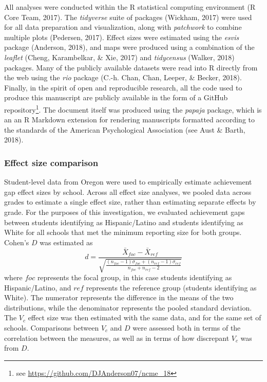 \documentclass[man, fleqn, noextraspace]{apa6}
\theoremstyle{definition}
\theoremstyle{definition}
\theoremstyle{definition}
\theoremstyle{remark}
\begin{document}
All analyses were conducted within the R statistical computing
environment (R Core Team, 2017). The \emph{tidyverse} suite of packages
(Wickham, 2017) were used for all data preparation and visualization,
along with \emph{patchwork} to combine multiple plots (Pedersen, 2017).
Effect sizes were estimated using the \emph{esvis} package (Anderson,
2018), and maps were produced using a combination of the \emph{leaflet}
(Cheng, Karambelkar, \& Xie, 2017) and \emph{tidycensus} (Walker, 2018)
packages. Many of the publicly available datasets were read into R
directly from the web using the \emph{rio} package (C.-h. Chan, Chan,
Leeper, \& Becker, 2018). Finally, in the spirit of open and
reproducible research, all the code used to produce this manuscript are
publicly available in the form of a GitHub repository\footnote{see
  \url{https://github.com/DJAnderson07/ncme_18}}. The document itself
was produced using the \emph{papaja} package, which is an an R Markdown
extension for rendering manuscripts formatted according to the standards
of the American Psychological Association (see Aust \& Barth, 2018).

\hypertarget{effect-size-comparison}{%
\subsubsection{Effect size comparison}\label{effect-size-comparison}}

Student-level data from Oregon were used to empirically estimate
achievement gap effect sizes by school. Across all effect size analyses,
we pooled data across grades to estimate a single effect size, rather
than estimating separate effects by grade. For the purposes of this
investigation, we evaluated achievement gaps between students
identifying as Hispanic/Latino and students identifying as White for all
schools that met the minimum reporting size for both groups. Cohen's
\(D\) was estimated as \begin{equation}
d = \frac{\bar{X}_{foc} - \bar{X}_{ref}}
        {\sqrt{\frac{(n_{foc} - 1)\sigma_{foc} + (n_{ref} - 1)\sigma_{ref}}
                  {n_{foc} + n_{ref} - 2}}}
\end{equation} where \(foc\) represents the focal group, in this case
students identifying as Hispanic/Latino, and \(ref\) represents the
reference group (students identifying as White). The numerator
represents the difference in the means of the two distributions, while
the denominator represents the pooled standard deviation. The \(V_c\)
effect size was then estimated with the same data, and for the same set
of schools. Comparisons between \(V_c\) and \(D\) were assessed both in
terms of the correlation between the measures, as well as in terms of
how discrepant \(V_c\) was from \(D\).
\end{document}
